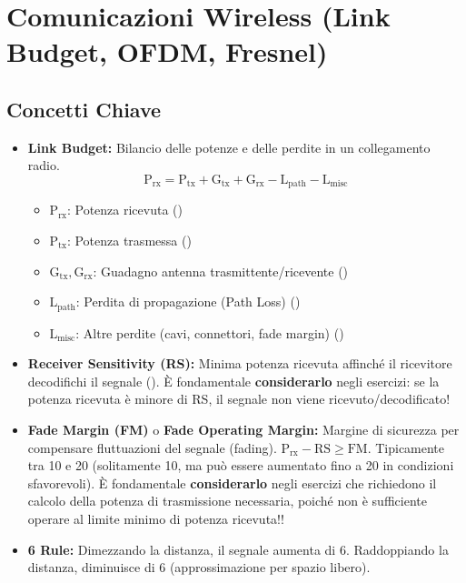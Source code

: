 \section{Comunicazioni Wireless (Link Budget, OFDM, Fresnel)}
\label{sec:wireless}

\subsection{Concetti Chiave}
\begin{itemize}
    \item \textbf{Link Budget:} Bilancio delle potenze e delle perdite in un collegamento radio.
    \[ \text{P}_{\text{rx}} = \text{P}_{\text{tx}} + \text{G}_{\text{tx}} + \text{G}_{\text{rx}} - \text{L}_{\text{path}} - \text{L}_{\text{misc}} \]
    \begin{itemize}
        \item $\text{P}_{\text{rx}}$: Potenza ricevuta ()
        \item $\text{P}_{\text{tx}}$: Potenza trasmessa ()
        \item $\text{G}_{\text{tx}}, \text{G}_{\text{rx}}$: Guadagno antenna trasmittente/ricevente ()
        \item $\text{L}_{\text{path}}$: Perdita di propagazione (Path Loss) ()
        \item $\text{L}_{\text{misc}}$: Altre perdite (cavi, connettori, fade margin) ()
    \end{itemize}
    \item \textbf{Receiver Sensitivity (RS):} Minima potenza ricevuta affinché il ricevitore decodifichi il segnale (). È fondamentale \textbf{considerarlo} negli esercizi: se la potenza ricevuta è minore di RS, il segnale non viene ricevuto/decodificato!
    \item \textbf{Fade Margin (FM)} o \textbf{Fade Operating Margin:} Margine di sicurezza per compensare fluttuazioni del segnale (fading). $\text{P}_{\text{rx}} - \text{RS} \ge \text{FM}$. Tipicamente tra 10 e 20 (solitamente 10, ma può essere aumentato fino a 20 in condizioni sfavorevoli). È fondamentale \textbf{considerarlo} negli esercizi che richiedono il calcolo della potenza di trasmissione necessaria, poiché non è sufficiente operare al limite minimo di potenza ricevuta!!
    \item \textbf{6 Rule:} Dimezzando la distanza, il segnale aumenta di 6. Raddoppiando la distanza, diminuisce di 6 (approssimazione per spazio libero).

\end{itemize}
